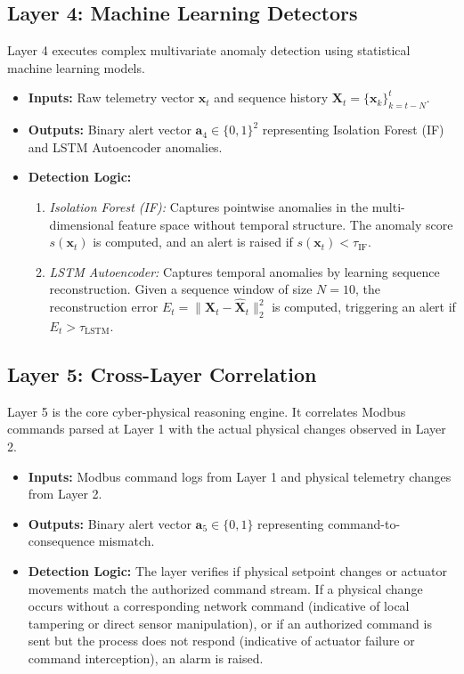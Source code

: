 \documentclass[journal,twoside,web]{ieeecolor}
\begin{document}
\subsection{Layer 4: Machine Learning Detectors}
Layer 4 executes complex multivariate anomaly detection using statistical machine learning models.
\begin{itemize}
    \item \textbf{Inputs:} Raw telemetry vector $\bm{x}_t$ and sequence history $\bm{X}_t = \{\bm{x}_k\}_{k=t-N}^t$.
    \item \textbf{Outputs:} Binary alert vector $\bm{a}_4 \in \{0,1\}^2$ representing Isolation Forest (IF) and LSTM Autoencoder anomalies.
    \item \textbf{Detection Logic:} 
    \begin{enumerate}
        \item \emph{Isolation Forest (IF):} Captures pointwise anomalies in the multi-dimensional feature space without temporal structure. The anomaly score $s(\bm{x}_t)$ is computed, and an alert is raised if $s(\bm{x}_t) < \tau_{\text{IF}}$.
        \item \emph{LSTM Autoencoder:} Captures temporal anomalies by learning sequence reconstruction. Given a sequence window of size $N=10$, the reconstruction error $E_t = \|\bm{X}_t - \hat{\bm{X}}_t\|^2_2$ is computed, triggering an alert if $E_t > \tau_{\text{LSTM}}$.
    \end{enumerate}
\end{itemize}

\subsection{Layer 5: Cross-Layer Correlation}
Layer 5 is the core cyber-physical reasoning engine. It correlates Modbus commands parsed at Layer 1 with the actual physical changes observed in Layer 2.
\begin{itemize}
    \item \textbf{Inputs:} Modbus command logs from Layer 1 and physical telemetry changes from Layer 2.
    \item \textbf{Outputs:} Binary alert vector $\bm{a}_5 \in \{0,1\}$ representing command-to-consequence mismatch.
    \item \textbf{Detection Logic:} The layer verifies if physical setpoint changes or actuator movements match the authorized command stream. If a physical change occurs without a corresponding network command (indicative of local tampering or direct sensor manipulation), or if an authorized command is sent but the process does not respond (indicative of actuator failure or command interception), an alarm is raised.
\end{itemize}
\end{document}
